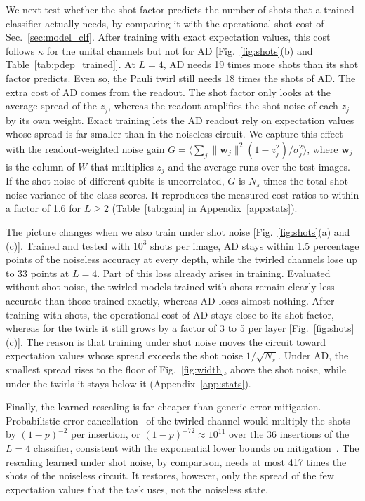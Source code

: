 \documentclass[
 aps,pra,
 twocolumn,
 superscriptaddress,
 longbibliography,
 nofootinbib
]{revtex4-2}
\begin{document}
We next test whether the shot factor predicts the number of shots that a
trained classifier actually needs, by comparing it with the operational shot
cost of Sec.~\ref{sec:model_clf}. After training with exact expectation values,
this cost follows $\kappa$ for the unital channels but not for AD
[Fig.~\ref{fig:shots}(b) and Table~\ref{tab:pdep_trained}]. At $L=4$, AD needs
19 times more shots than its shot factor predicts. Even so, the Pauli twirl
still needs 18 times the shots of AD. The extra cost of AD comes from the
readout. The shot factor only looks at the average spread of the $z_j$, whereas
the readout amplifies the shot noise of each $z_j$ by its own weight. Exact
training lets the AD readout rely on expectation values whose spread is far
smaller than in the noiseless circuit. We capture this effect with the
readout-weighted noise gain
$G=\bigl\langle\sum_j\lVert\mathbf w_j\rVert^2(1-z_j^2)/\sigma_j^2\bigr\rangle$,
where $\mathbf w_j$ is the column of $W$ that multiplies $z_j$ and the average
runs over the test images. If the shot noise of different qubits is
uncorrelated, $G$ is $N_s$ times the total shot-noise variance of the class
scores. It reproduces the measured cost ratios to within a factor of 1.6 for
$L\ge2$ (Table~\ref{tab:gain} in Appendix~\ref{app:stats}).

The picture changes when we also train under shot noise
[Fig.~\ref{fig:shots}(a) and (c)]. Trained and tested with $10^3$ shots per
image, AD stays within 1.5 percentage points of the noiseless accuracy at every
depth, while the twirled channels lose up to 33 points at $L=4$. Part of this
loss already arises in training. Evaluated without shot noise, the twirled
models trained with shots remain clearly less accurate than those trained
exactly, whereas AD loses almost nothing. After training with shots, the
operational cost of AD stays close to its shot factor, whereas for the twirls
it still grows by a factor of 3 to 5 per layer [Fig.~\ref{fig:shots}(c)]. The
reason is that training under shot noise moves the circuit toward expectation
values whose spread exceeds the shot noise $1/\sqrt{N_s}$. Under AD, the
smallest spread rises to the floor of Fig.~\ref{fig:width}, above the shot
noise, while under the twirls it stays below it (Appendix~\ref{app:stats}).

Finally, the learned rescaling is far
cheaper than generic error mitigation. Probabilistic error
cancellation~\cite{temme2017error} of the twirled channel would multiply the
shots by $(1-p)^{-2}$ per insertion, or $(1-p)^{-72}\approx10^{11}$ over the 36
insertions of the $L=4$ classifier, consistent with the exponential lower
bounds on mitigation~\cite{takagi2023universal,quek2024exponentially}. The
rescaling learned under shot noise, by comparison, needs at most 417 times the
shots of the noiseless circuit. It restores, however, only the spread of the few
expectation values that the task uses, not the noiseless state.
\end{document}
